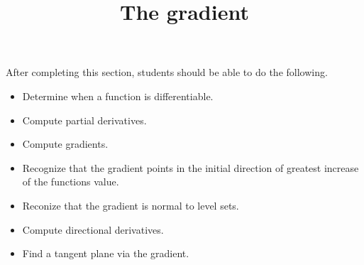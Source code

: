 \documentclass{ximera}
\title{The gradient}
\begin{document}
\begin{abstract}
\end{abstract}

\maketitle

\begin{sectionOutcomes}

After completing this section, students should be able to do the following.

\begin{itemize}
\item Determine when a function is differentiable.
\item Compute partial derivatives.
\item Compute gradients.
\item Recognize that the gradient points in the initial direction of
  greatest increase of the functions value.
\item Reconize that the gradient is normal to level sets.
\item Compute directional derivatives.
\item Find a tangent plane via the gradient.
\end{itemize}

\end{sectionOutcomes}
\end{document}
